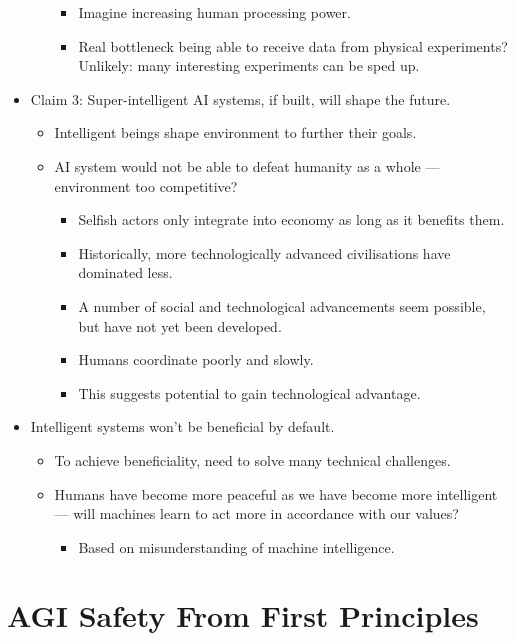 \begin{itemize}
\begin{itemize}
\begin{itemize}
            \item Imagine increasing human processing power.
            \item Real bottleneck being able to receive data from physical experiments? Unlikely: many interesting experiments can be sped up.
        \end{itemize}
    \end{itemize}
    \item Claim 3: Super-intelligent AI systems, if built, will shape the future.
    \begin{itemize}
        \item Intelligent beings shape environment to further their goals.
        \item AI system would not be able to defeat humanity as a whole — environment too competitive?
        \begin{itemize}
            \item Selfish actors only integrate into economy as long as it benefits them.
            \item Historically, more technologically advanced civilisations have dominated less.
            \item A number of social and technological advancements seem possible, but have not yet been developed.
            \item Humans coordinate poorly and slowly.
            \item This suggests potential to gain technological advantage.
        \end{itemize}
    \end{itemize}
    \item Intelligent systems won't be beneficial by default.
    \begin{itemize}
        \item To achieve beneficiality, need to solve many technical challenges.
        \item Humans have become more peaceful as we have become more intelligent — will machines learn to act more in accordance with our values?
        \begin{itemize}
            \item Based on misunderstanding of machine intelligence.
        \end{itemize}
    \end{itemize}
\end{itemize}


\section{AGI Safety From First Principles}

